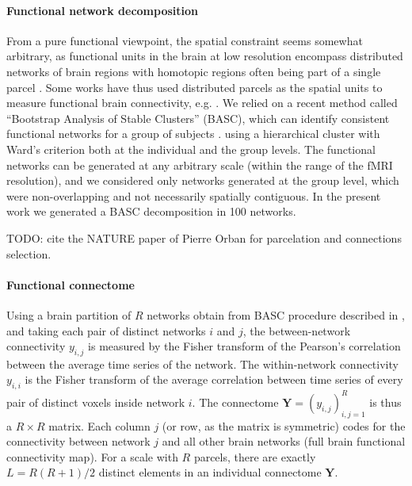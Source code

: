 \documentclass[authoryear]{elsarticle}
\begin{document}
\paragraph{Functional network decomposition}
From a pure functional viewpoint, the spatial constraint seems somewhat arbitrary, as functional units in the brain at low resolution encompass distributed networks of brain regions with homotopic regions often being part of a single parcel \citep{DeLuca2006,Damoiseaux2006}. Some works have thus used distributed parcels as the spatial units to measure functional brain connectivity, e.g. \citep{Jafri2007,Marrelec2008}. We relied on a recent method called “Bootstrap Analysis of Stable Clusters” (BASC), which can identify consistent functional networks for a group of subjects \citep{Biswal2010}. using a hierarchical cluster with Ward’s criterion both at the individual and the group levels. The functional networks can be generated at any arbitrary scale (within the range of the fMRI resolution), and we considered only networks generated at the group level, which were non-overlapping and not necessarily spatially contiguous. In the present work we generated a BASC decomposition in 100 networks.

TODO: cite the NATURE paper of Pierre Orban for parcelation and connections selection.

\paragraph{Functional connectome}
Using a brain partition of $R$ networks obtain from BASC procedure described in \cite{Bellec2010c}, and taking each pair of distinct networks $i$ and $j$, the between-network connectivity $y_{i,j}$ is measured by the Fisher transform of the Pearson's correlation between the average time series of the network. The within-network connectivity $y_{i,i}$ is the Fisher transform of the average correlation between time series of every pair of distinct voxels inside network $i$. The connectome $\mathbf{Y}=(y_{i,j})_{i,j=1}^R$ is thus a $R\times R$ matrix. Each column $j$ (or row, as the matrix is symmetric) codes for the connectivity between network $j$ and all other brain networks (full brain functional connectivity map). For a scale with $R$ parcels, there are exactly $L=R(R+1)/2$ distinct elements in an individual connectome $\mathbf{Y}$.
\end{document}
